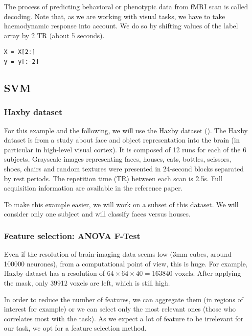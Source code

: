 \documentclass{frontiersSCNS} %
\begin{document}
The process of predicting behavioral or phenotypic data from fMRI scan is
called decoding. Note that, as we are working with visual tasks, we have to take
haemodynamic response into account. We do so by shifting values of the label
array by 2 TR (about 5 seconds).

\begin{lstlisting}
X = X[2:]
y = y[:-2]
\end{lstlisting}

\subsection{SVM}

\subsubsection{Haxby dataset}

For this example and the following, we will use the Haxby dataset
(\cite{haxby2001}).
The Haxby dataset is from a study about face and object representation into the
brain (in particular in high-level visual cortex). It is composed of 12 runs for
each of the 6 subjects. Grayscale images representing faces, houses, cats,
bottles, scissors, shoes, chairs and random textures were presented in
24-second blocks separated by rest periods. The repetition time (TR) between each
scan is 2.5s. Full acquisition information are available in the reference paper.

To make this example easier, we will work on a subset of this dataset. We will
consider only one subject and will classify faces versus houses.

\subsubsection{Feature selection: ANOVA F-Test}

Even if the resolution of brain-imaging data seems low (3mm cubes, around 100000
neurones), from a computational point of view, this is huge. For example,
Haxby dataset has a resolution of $64\times64\times40 = 163840\text{ voxels}$.
After applying the mask, only 39912 voxels are left, which is still high.

In order to reduce the number of features, we can aggregate them (in regions of
interest for example) or we can select only the most relevant ones (those who
correlates most with the task). As we expect a lot of feature to be irrelevant
for our task, we opt for a feature selection method.
\end{document}
